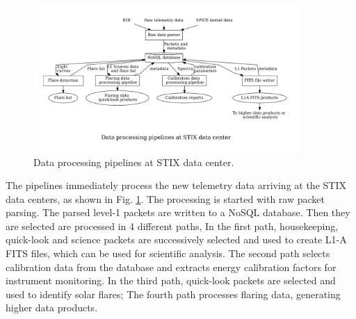 \documentclass[referee]{aa} %
\begin{document}
\begin{figure}
    \centering
    \includegraphics[width=0.9\textwidth]{figures/pipelines.pdf}
    \caption{Data processing pipelines at STIX data center.}
    \label{fig:main_pipelines}
\end{figure}
The pipelines immediately process the new telemetry data arriving at the STIX data centers, as shown 
in Fig. \ref{fig:main_pipelines}. 
The processing is started with raw packet parsing. The parsed level-1 packets are written to a NoSQL database. Then they are selected  are processed in 4 different paths, 
In the first path,  housekeeping, quick-look and science packets are successively selected and used to create L1-A FITS files, 
which can be used for scientific analysis. The second path selects calibration data from the database and extracts energy calibration factors for instrument monitoring. In the third path, quick-look packets are selected and used to identify solar
flares; The fourth path processes flaring data, generating higher data products.   
\end{document}
